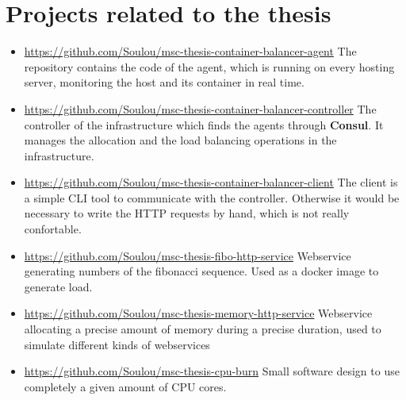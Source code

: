 \chapter{Projects related to the thesis}
\label{app:rel-projects}

\begin{itemize}
\item{\url{https://github.com/Soulou/msc-thesis-container-balancer-agent}\newline\vspace{1em}
The repository contains the code of the agent, which is running on every
hosting server, monitoring the host and its container in real time.}

\item{\url{https://github.com/Soulou/msc-thesis-container-balancer-controller}\newline\vspace{1em}
The controller of the infrastructure which finds the agents through
\textbf{Consul}. It manages the allocation and the load balancing operations in
the infrastructure.}

\item{\url{https://github.com/Soulou/msc-thesis-container-balancer-client}\newline\vspace{1em}
The client is a simple CLI tool to communicate with the controller. Otherwise
it would be necessary to write the HTTP requests by hand, which is not really
confortable.}

\item{\url{https://github.com/Soulou/msc-thesis-fibo-http-service}\newline\vspace{1em}
Webservice generating numbers of the fibonacci sequence. Used as a docker image
to generate load.}

\item{\url{https://github.com/Soulou/msc-thesis-memory-http-service}\newline\vspace{1em}
Webservice allocating a precise amount of memory during a precise duration,
used to simulate different kinds of webservices}

\item{\url{https://github.com/Soulou/msc-thesis-cpu-burn}\newline\vspace{1em}
Small software design to use completely a given amount of CPU cores.}


\end{itemize}
